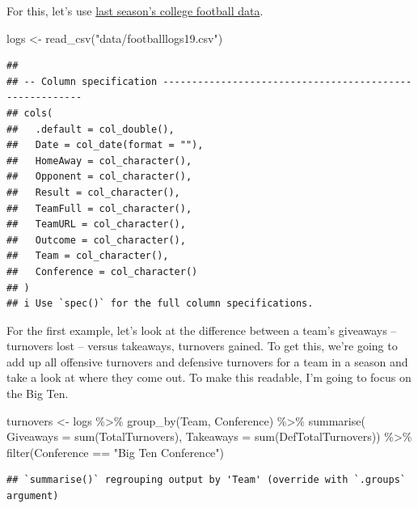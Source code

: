 \documentclass[
]{book}
\newenvironment{Shaded}{\begin{snugshade}}{\end{snugshade}}
\newcommand{\AttributeTok}[1]{\textcolor[rgb]{0.77,0.63,0.00}{#1}}
\newcommand{\FunctionTok}[1]{\textcolor[rgb]{0.00,0.00,0.00}{#1}}
\newcommand{\NormalTok}[1]{#1}
\newcommand{\OtherTok}[1]{\textcolor[rgb]{0.56,0.35,0.01}{#1}}
\newcommand{\SpecialCharTok}[1]{\textcolor[rgb]{0.00,0.00,0.00}{#1}}
\newcommand{\StringTok}[1]{\textcolor[rgb]{0.31,0.60,0.02}{#1}}
\begin{document}
For this, let's use \href{https://unl.box.com/s/2prgq48ctoxlukn6kmfjw0u1opda5s0m}{last season's college football data}.

\begin{Shaded}
\begin{Highlighting}[]
\NormalTok{logs }\OtherTok{\textless{}{-}} \FunctionTok{read\_csv}\NormalTok{(}\StringTok{"data/footballlogs19.csv"}\NormalTok{)}
\end{Highlighting}
\end{Shaded}

\begin{verbatim}
## 
## -- Column specification --------------------------------------------------------
## cols(
##   .default = col_double(),
##   Date = col_date(format = ""),
##   HomeAway = col_character(),
##   Opponent = col_character(),
##   Result = col_character(),
##   TeamFull = col_character(),
##   TeamURL = col_character(),
##   Outcome = col_character(),
##   Team = col_character(),
##   Conference = col_character()
## )
## i Use `spec()` for the full column specifications.
\end{verbatim}

For the first example, let's look at the difference between a team's giveaways -- turnovers lost -- versus takeaways, turnovers gained. To get this, we're going to add up all offensive turnovers and defensive turnovers for a team in a season and take a look at where they come out. To make this readable, I'm going to focus on the Big Ten.

\begin{Shaded}
\begin{Highlighting}[]
\NormalTok{turnovers }\OtherTok{\textless{}{-}}\NormalTok{ logs }\SpecialCharTok{\%\textgreater{}\%}
  \FunctionTok{group\_by}\NormalTok{(Team, Conference) }\SpecialCharTok{\%\textgreater{}\%} 
  \FunctionTok{summarise}\NormalTok{(}
    \AttributeTok{Giveaways =} \FunctionTok{sum}\NormalTok{(TotalTurnovers), }
    \AttributeTok{Takeaways =} \FunctionTok{sum}\NormalTok{(DefTotalTurnovers)) }\SpecialCharTok{\%\textgreater{}\%}
  \FunctionTok{filter}\NormalTok{(Conference }\SpecialCharTok{==} \StringTok{"Big Ten Conference"}\NormalTok{)}
\end{Highlighting}
\end{Shaded}

\begin{verbatim}
## `summarise()` regrouping output by 'Team' (override with `.groups` argument)
\end{verbatim}
\end{document}
